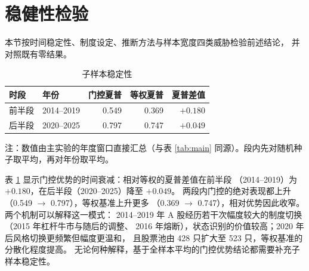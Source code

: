 \section{稳健性检验}
\label{sec:robust}

本节按时间稳定性、制度设定、推断方法与样本宽度四类威胁检验前述结论，
并对照既有零结果。

\begin{table}[htbp]
\centering
\caption{子样本稳定性}
\label{tab:subsample}
\begin{threeparttable}
\small
\begin{tabular}{llrrr}
\toprule
时段 & 年份 & 门控夏普 & 等权夏普 & 夏普差值 \\
\midrule
前半段 & 2014--2019 & 0.549 & 0.369 & $+0.180$ \\
后半段 & 2020--2025 & 0.797 & 0.747 & $+0.049$ \\
\bottomrule
\end{tabular}
\begin{tablenotes}[flushleft]\footnotesize
\item 注：数值由主实验的年度窗口直接汇总（与表 \ref{tab:main} 同源）。段内先对随机种子取平均，再对年份取平均。
\end{tablenotes}
\end{threeparttable}
\end{table}

表 \ref{tab:subsample} 显示门控优势的时间衰减：相对等权的夏普差值在前半段
（2014--2019）为 $+0.180$，在后半段（2020--2025）降至 $+0.049$。
两段内门控的绝对表现都上升（0.549 $\to$ 0.797），等权基准上升更多
（0.369 $\to$ 0.747），相对优势因此收窄。两个机制可以解释这一模式：
2014--2019 年 A 股经历若干次幅度较大的制度切换（2015 年杠杆牛市与随后的调整、
2016 年熔断），状态识别的价值较高；2020 年后风格切换更频繁但幅度更温和，
且股票池由 428 只扩大至 523 只，等权基准的分散化程度提高。
无论何种解释，基于全样本平均的门控优势结论都需要补充子样本稳定性。

